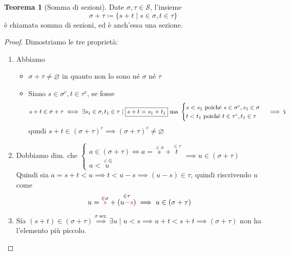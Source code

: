 \documentclass[a4paper,10pt]{article}
\theoremstyle{definition}
\newcommand{\qu}{\mathbb{Q}} %
\theoremstyle{indentdefinition}
\theoremstyle{indentpostulate}
\theoremstyle{indenttheorem}
\newtheorem{thm}{Teorema}[section]
\theoremstyle{myremark}
\theoremstyle{indentgeneral}
\newenvironment{myboxed} 
{\noindent\begin{lrbox}{\mybox}\begin{minipage}{\textwidth}}
{\end{minipage}\end{lrbox}\fbox{\usebox{\mybox}}}
\begin{document}
\begin{myboxed}
    \begin{thm}[Somma di sezioni]
        Date $\sigma,\tau\in\mathscr{S}$, l'insieme
        $$\sigma +\tau\coloneqq\{s+t\mid s\in\sigma,t\in\tau\} $$
        è chiamata somma di sezioni, ed è anch'essa una sezione.
    \end{thm}
\end{myboxed}

\begin{proof}
    Dimostriamo le tre proprietà:
    \begin{enumerate}
        \item Abbiamo
        \begin{itemize}
            \item $\sigma+\tau\ne\varnothing$ in quanto non lo sono né $\sigma$ né $\tau$
            \item Siano $s\in\sigma^c,t\in\tau^c$, se fosse
            $$s+t\in\sigma+\tau\iff\exists s_1\in\sigma,t_1\in\tau\mid  \boxed{s+t=s_1+t_1}\text{ ma }\begin{cases}
                s<s_1 \text{ poiché }s\in\sigma^c,s_1\in\sigma\\
                t<t_1 \text{ poiché }t\in\tau^c,t_1\in\tau
            \end{cases} \implies\text{\lightning}$$
            qundi $s+t\in(\sigma+\tau)^c\implies (\sigma+\tau)^c\ne \varnothing$
        \end{itemize}
        \item Dobbiamo dim. che $\begin{cases}
          a\in (\sigma+\tau)\iff a=\overset{\in\sigma}{s}+\overset{\in\tau}{t}\\
          a<\overset{\in\qu}{u}
        \end{cases}\implies u\in(\sigma+\tau)$\\
        Quindi sia $a=s+t<u\implies t<u-s \implies (u-s)\in \tau$, quindi riscrivendo $u$ come
        $$u=\overset{\in\sigma}{\textcolor{red}{s}}+\overset{\in\tau}{(u\textcolor{red}{-s})}\implies u\in(\sigma+\tau)$$
        \item Sia $(s+t)\in(\sigma+\tau)\overset{\sigma\text{ sez.}}{\implies}\exists u\mid u<s \implies u+t<s+t\implies(\sigma+\tau)$ non ha l'elemento più piccolo.
    \end{enumerate}
\end{proof}
\end{document}
